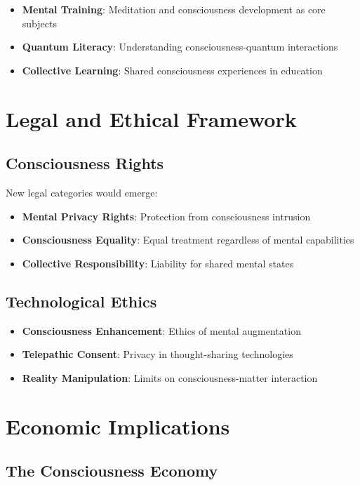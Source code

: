 \documentclass[12pt,article]{memoir}
\begin{document}
\begin{itemize}
    \item \textbf{Mental Training}: Meditation and consciousness development as core subjects
    \item \textbf{Quantum Literacy}: Understanding consciousness-quantum interactions
    \item \textbf{Collective Learning}: Shared consciousness experiences in education
\end{itemize}

\section{Legal and Ethical Framework}

\subsection{Consciousness Rights}

New legal categories would emerge:

\begin{itemize}
    \item \textbf{Mental Privacy Rights}: Protection from consciousness intrusion
    \item \textbf{Consciousness Equality}: Equal treatment regardless of mental capabilities
    \item \textbf{Collective Responsibility}: Liability for shared mental states
\end{itemize}

\subsection{Technological Ethics}

\begin{itemize}
    \item \textbf{Consciousness Enhancement}: Ethics of mental augmentation
    \item \textbf{Telepathic Consent}: Privacy in thought-sharing technologies
    \item \textbf{Reality Manipulation}: Limits on consciousness-matter interaction
\end{itemize}

\section{Economic Implications}

\subsection{The Consciousness Economy}
\end{document}
